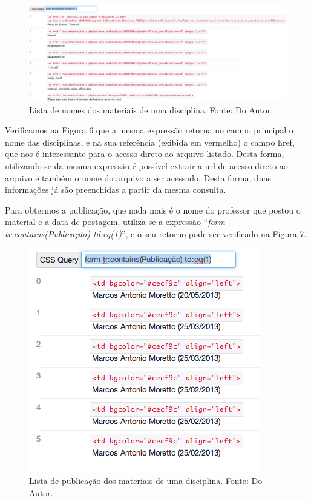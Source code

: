 \begin{figure}[!htb]
     \centering
     \includegraphics[scale=0.35]{imagens/listamateriaisdisciplinasnomematerial.png}
     \caption[Extração de Informações - Lista de Nomes dos Materiais de uma disciplina]{Lista de nomes dos materiais de uma disciplina. Fonte: Do Autor.}
\end{figure}

Verificamos na Figura 6 que a mesma expressão retorna no campo principal o nome das disciplinas, e na sua referência (exibida em vermelho) o campo href, que nos é interessante para o acesso direto ao arquivo listado. Desta forma, utilizando-se da mesma expressão é possível extrair a url de acesso direto ao arquivo e também o nome do arquivo a ser acessado. Desta forma, duas informações já são preenchidas a partir da mesma consulta. 

Para obtermos a publicação, que nada mais é o nome do professor que postou o material e a data de postagem, utiliza-se a expressão ``\emph{form tr:contains(Publicação) td:eq(1)}'', e o seu retorno pode ser verificado na Figura 7.

\begin{figure}[!htb]
     \centering
     \includegraphics[scale=0.7]{imagens/listamateriaisdisciplinaspublicacao.png}
     \caption[Extração de Informações - Lista das publicações dos materiais]{Lista de publicação dos materiais de uma disciplina. Fonte: Do Autor.}
\end{figure}


